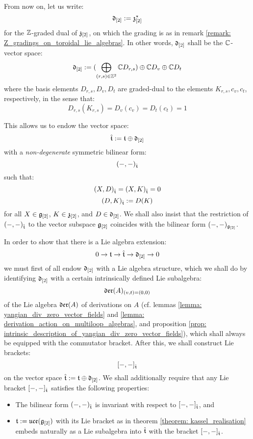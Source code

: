         \begin{convention} \label{conv: orthogonal_complement_of_toroidal_centres}
            From now on, let us write:
                $$\mathfrak{d}_{[2]} := \mathfrak{z}_{[2]}^{\star}$$
            for the $\mathbb{Z}$-graded dual of $\mathfrak{z}_{[2]}$, on which the grading is as in remark \ref{remark: Z_gradings_on_toroidal_lie_algebras}. In other words, $\mathfrak{d}_{[2]}$ shall be the $\mathbb{C}$-vector space:
                $$\mathfrak{d}_{[2]} := ( \bigoplus_{(r, s) \in \mathbb{Z}^2} \mathbb{C} D_{r, s} ) \oplus \mathbb{C} D_v \oplus \mathbb{C} D_t$$
            where the basis elements $D_{r, s}, D_v, D_t$ are graded-dual to the elements $K_{r, s}, c_v, c_t$, respectively, in the sense that:
                $$D_{r, s}(K_{r, s}) = D_v(c_v) = D_t(c_t) = 1$$

            This allows us to endow the vector space:
                $$\hat{\mathfrak{t}} := \mathfrak{t} \oplus \mathfrak{d}_{[2]}$$
            with a \textit{non-degenerate} symmetric bilinear form:
                $$(-, -)_{\hat{\mathfrak{t}}}$$
            such that:
                $$(X, D)_{\hat{\mathfrak{t}}} = (X, K)_{\hat{\mathfrak{t}}} = 0$$
                $$(D, K)_{\hat{\mathfrak{t}}} := D(K)$$
            for all $X \in \mathfrak{g}_{[2]}$, $K \in \mathfrak{z}_{[2]}$, and $D \in \mathfrak{d}_{[2]}$. We shall also insist that the restriction of $(-, -)_{\hat{\mathfrak{t}}}$ to the vector subspace $\mathfrak{g}_{[2]}$ coincides with the bilinear form $(-, -)_{\mathfrak{g}_{[2]}}$.
        \end{convention}

        In order to show that there is a Lie algebra extension:
            $$0 \to \mathfrak{t} \to \hat{\mathfrak{t}} \to \mathfrak{d}_{[2]} \to 0$$
        we must first of all endow $\mathfrak{d}_{[2]}$ with a Lie algebra structure, which we shall do by identifying $\mathfrak{d}_{[2]}$ with a certain intrinsically defined Lie subalgebra:
            $$\mathfrak{der}(A)_{(v, t) = (0, 0)}$$
        of the Lie algebra $\mathfrak{der}(A)$ of derivations on $A$ (cf. lemmas \ref{lemma: yangian_div_zero_vector_fields} and \ref{lemma: derivation_action_on_multiloop_algebras}, and proposition \ref{prop: intrinsic_description_of_yangian_div_zero_vector_fields}), which shall always be equipped with the commutator bracket. After this, we shall construct Lie brackets:
            $$[-, -]_{\hat{\mathfrak{t}}}$$
        on the vector space $\hat{\mathfrak{t}} := \mathfrak{t} \oplus \mathfrak{d}_{[2]}$. We shall additionally require that any Lie bracket $[-, -]_{\hat{\mathfrak{t}}}$ satisfies the following properties:
        \begin{itemize}
            \item The bilinear form $(-, -)_{\hat{\mathfrak{t}}}$ is invariant with respect to $[-, -]_{\hat{\mathfrak{t}}}$, and
            \item $\mathfrak{t} := \mathfrak{uce}(\mathfrak{g}_{[2]})$ with its Lie bracket as in theorem \ref{theorem: kassel_realisation} embeds naturally as a Lie subalgebra into $\hat{\mathfrak{t}}$ with the bracket $[-, -]_{\hat{\mathfrak{t}}}$. 
        \end{itemize}

